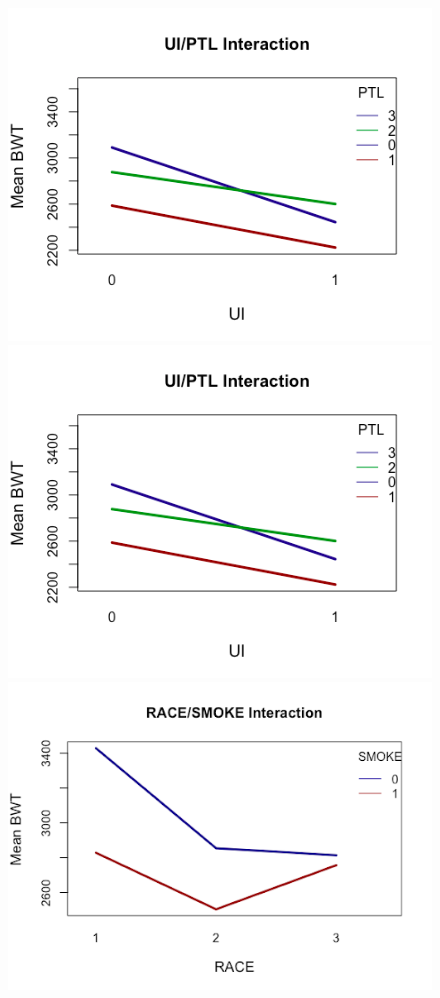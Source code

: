 \begin{figure}[!htb]
  \includegraphics[width=\linewidth]{Images/AGEvsSMOKE.png}
  \caption{}\label{AGEvsSMOKE}
\endminipage\hfill
{}
  \includegraphics[width=\linewidth]{Images/UIvsPTL.png}
  \caption{}\label{UIvsPTL}
\endminipage\hfill
{}%
  \includegraphics[width=\linewidth]{Images/RACEvsSMOKE.png}
  \caption{}\label{RACEvsSMOKE}
\endminipage
\end{figure}

